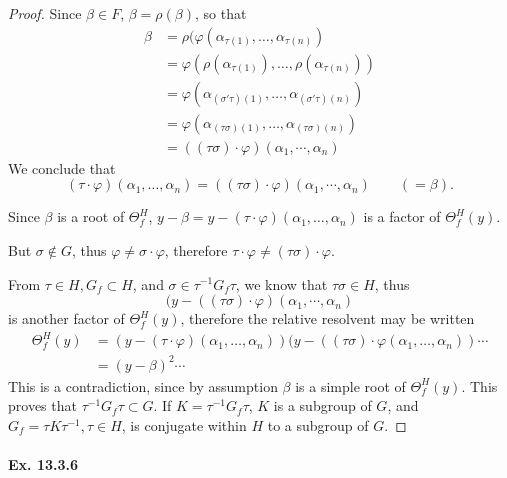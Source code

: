 \documentclass[11pt,a4paper]{article}
\begin{document}
{\begin{proof}
Since $\beta \in F$, $\beta = \rho(\beta)$, so that
\begin{align*}
\beta &= \rho(\varphi(\alpha_{\tau(1)},\ldots,\alpha_{\tau(n)})\\
&=\varphi(\rho(\alpha_{\tau(1)}), \ldots,\rho(\alpha_{\tau(n)}))\\
&=\varphi(\alpha_{(\sigma'\tau)(1)},\ldots,\alpha_{(\sigma' \tau)(n)})\\
&=\varphi(\alpha_{(\tau\sigma)(1)},\ldots,\alpha_{(\tau \sigma)(n)})\\
&=((\tau \sigma )\cdot \varphi)(\alpha_1,\cdots, \alpha_n)
\end{align*}
We conclude that
$$(\tau \cdot \varphi)(\alpha_1,\ldots,\alpha_n) = ((\tau \sigma )\cdot \varphi)(\alpha_1,\cdots, \alpha_n) \qquad (= \beta).$$

Since $\beta$ is a root of $\Theta_f^H$, $ y - \beta = y - (\tau \cdot \varphi)(\alpha_1,\ldots,\alpha_n)$ is a factor of $\Theta_f^H(y)$.

But $\sigma \not \in G$, thus $\varphi \ne \sigma \cdot \varphi$, therefore $\tau \cdot \varphi \ne (\tau \sigma )\cdot \varphi$.

From $\tau \in H, G_f \subset H$, and $\sigma \in \tau^{-1} G_f \tau$, we know that $\tau\sigma \in  H$, thus 
$$(y - ((\tau \sigma )\cdot \varphi)(\alpha_1,\cdots, \alpha_n)$$ is another factor of $\Theta_f^H(y)$, therefore the relative resolvent may be written
\begin{align*}
\Theta_f^H(y) &= (y - (\tau \cdot \varphi)(\alpha_1,\ldots,\alpha_n)) (y - ((\tau \sigma) \cdot\varphi(\alpha_1,\ldots,\alpha_n))\cdots\\
&= (y- \beta)^2\cdots
 \end{align*}
 This is a contradiction, since by assumption $\beta$ is a simple root of $\Theta_f^H(y)$.
 This proves that $\tau^{-1} G_f \tau \subset G$. If $K = \tau^{-1} G_f \tau$, $K$ is a subgroup of $G$, and $G_f = \tau K \tau^{-1}, \tau \in H$, is conjugate within $H$ to a subgroup of $G$.
\end{proof}
}

\paragraph{Ex. 13.3.6}
\end{document}
